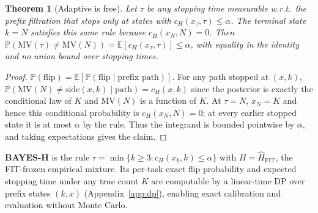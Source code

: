 \documentclass{article}
\newtheorem{theorem}{Theorem}
\theoremstyle{definition}
\theoremstyle{remark}
\newcommand{\flip}{\mathrm{flip}}
\newcommand{\cert}{c_H}
\newcommand{\MV}{\mathrm{MV}}
\newcommand{\E}{\mathbb{E}}
\renewcommand{\P}{\mathbb{P}}
\begin{document}
\begin{theorem}[Adaptive is free]
\label{thm:tower}
Let $\tau$ be any stopping time measurable w.r.t.\ the prefix filtration that
stops only at states with $\cert(x_\tau,\tau)\le\alpha$. The terminal state
$k=N$ satisfies this same rule because $\cert(x_N,N)=0$. Then
$\P(\MV(\tau)\neq\MV(N)) = \E[\cert(x_\tau,\tau)] \le \alpha$,
with equality in the identity and no union bound over stopping times.
\end{theorem}
\begin{proof}
$\P(\flip)=\E[\P(\flip\mid\text{prefix path})]$. For any path stopped at
$(x,k)$, $\P(\MV(N)\neq\mathrm{side}(x,k)\mid\text{path})=\cert(x,k)$ since
the posterior is exactly the conditional law of $K$ and $\MV(N)$ is a
function of $K$. At $\tau=N$, $x_N=K$ and hence this conditional probability
is $\cert(x_N,N)=0$; at every earlier stopped state it is at most $\alpha$ by
the rule. Thus the integrand is bounded pointwise by $\alpha$, and taking
expectations gives the claim.
\end{proof}

\textbf{BAYES-H} is the rule $\tau=\min\{k\ge 3:\cert(x_k,k)\le\alpha\}$ with
$H=\widehat H_{\mathrm{FIT}}$, the FIT-frozen empirical mixture. Its per-task exact flip
probability and expected stopping time under any true count $K$ are computable
by a linear-time DP over prefix states $(k,x)$ (Appendix~\ref{app:dp}),
enabling exact calibration and evaluation without Monte Carlo.
\end{document}

